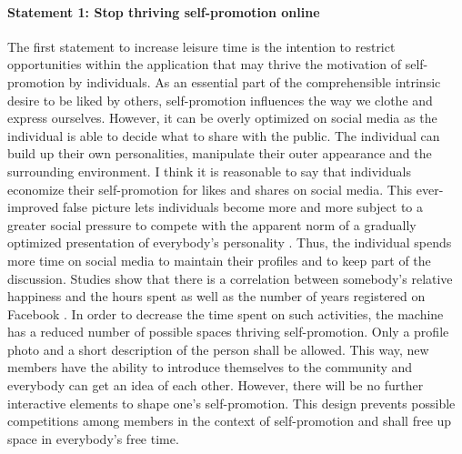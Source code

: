 \documentclass[12pt,numbers=noenddot,parskip,bibliography=totocnumbered,listof=totocnumbered,draft]{scrreprt}
\begin{document}
\paragraph{Statement 1: Stop thriving self-promotion online}
The first statement to increase leisure time is the intention to restrict opportunities within the application that may thrive the motivation of self-promotion by individuals. As an essential part of the comprehensible intrinsic desire to be liked by others, self-promotion influences the way we clothe and express ourselves. However, it can be overly optimized on social media as the individual is able to decide what to share with the public. The individual can build up their own personalities, manipulate their outer appearance and the surrounding environment. I think it is reasonable to say that individuals economize their self-promotion for likes and shares on social media. This ever-improved false picture lets individuals become more and more subject to a greater social pressure to compete with the apparent norm of a gradually optimized presentation of everybody's personality \citep{jay2012}. Thus, the individual spends more time on social media to maintain their profiles and to keep part of the discussion. Studies show that there is a correlation between somebody's relative happiness and the hours spent as well as the number of years registered on Facebook \citep[p.119]{chou2012}.\newline
In order to decrease the time spent on such activities, the machine has a reduced number of possible spaces thriving self-promotion. Only a profile photo and a short description of the person shall be allowed. This way, new members have the ability to introduce themselves to the community and everybody can get an idea of each other. However, there will be no further interactive elements to shape one's self-promotion. This design prevents possible competitions among members in the context of self-promotion and shall free up space in everybody's free time.
\end{document}
